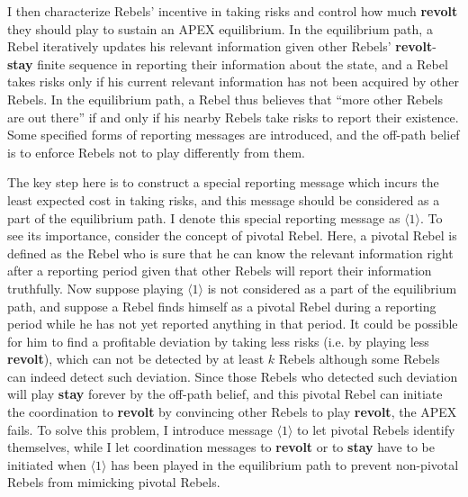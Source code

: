 \documentclass[12pt,letter]{article}
\theoremstyle{definition}
\theoremstyle{remark}
\theoremstyle{claim}
\begin{document}
I then characterize Rebels' incentive in taking risks and control how much \textbf{revolt} they should play to sustain an APEX equilibrium. In the equilibrium path, a Rebel iteratively updates his relevant information given other Rebels' \textbf{revolt}-\textbf{stay} finite sequence in reporting their information about the state, and a Rebel takes risks only if his current relevant information has not been acquired by other Rebels. In the equilibrium path, a Rebel thus believes that ``more other Rebels are out there'' if and only if his nearby Rebels take risks to report their existence. Some specified forms of reporting messages are introduced, and the off-path belief is to enforce Rebels not to play differently from them.

The key step here is to construct a special reporting message which incurs the least expected cost in taking risks, and this message should be considered as a part of the equilibrium path. I denote this special reporting message as $\langle 1 \rangle$. To see its importance, consider the concept of pivotal Rebel. Here, a pivotal Rebel is defined as the Rebel who is sure that he can know the relevant information right after a reporting period given that other Rebels will report their information truthfully. Now suppose playing $\langle 1 \rangle$ is not considered as a part of the equilibrium path, and suppose a Rebel finds himself as a pivotal Rebel during a reporting period while he has not yet reported anything in that period. It could be possible for him to find a profitable deviation by taking less risks (i.e. by playing less \textbf{revolt}), which can not be detected by at least $k$ Rebels although some Rebels can indeed detect such deviation. Since those Rebels who detected such deviation will play \textbf{stay} forever by the off-path belief, and this pivotal Rebel can initiate the coordination to \textbf{revolt} by convincing other Rebels to play \textbf{revolt}, the APEX fails. To solve this problem, I introduce message $\langle 1 \rangle$ to let pivotal Rebels identify themselves, while I let coordination messages to \textbf{revolt} or to \textbf{stay} have to be initiated when $\langle 1 \rangle$ has been played in the equilibrium path to prevent non-pivotal Rebels from mimicking pivotal Rebels.
\end{document}
